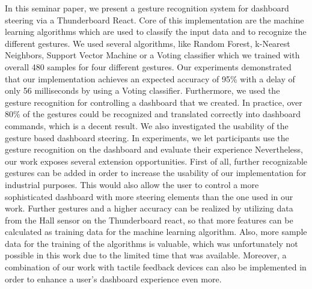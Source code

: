 In this seminar paper, we present a gesture recognition system for dashboard steering via a Thunderboard React. 
Core of this implementation are the machine learning algorithms which are used to classify the input data and to recognize the different gestures. 
We used several algorithms, like Random Forest, k-Nearest Neighbors, Support Vector Machine or a Voting classifier which we trained with overall 480 samples for four different gestures. 
Our experiments demonstrated that our implementation achieves an expected accuracy of 95\% with a delay of only 56 milliseconds by using a Voting classifier. 
Furthermore, we used the gesture recognition for controlling a dashboard that we created. 
In practice, over 80\% of the gestures could be recognized and translated correctly into dashboard commands, which is a decent result. 
\newline
We also investigated the usability of the gesture based dashboard steering. 
In experiments, we let participants use the gesture recognition on the dashboard and evaluate their experience 
\newline
Nevertheless, our work exposes several extension opportunities. 
First of all, further recognizable gestures can be added in order to increase the usability of our implementation for industrial purposes. 
This would also allow the user to control a more sophisticated dashboard with more steering elements than the one used in our work.
Further gestures and a higher accuracy can be realized by utilizing data from the Hall sensor on the Thunderboard react, so that more features can be calculated as training data for the machine learning algorithm. 
Also, more sample data for the training of the algorithms is valuable, which was unfortunately not possible in this work due to the limited time that was available. 
Moreover, a combination of our work with tactile feedback devices can also be implemented in order to enhance a user’s dashboard experience even more. 


